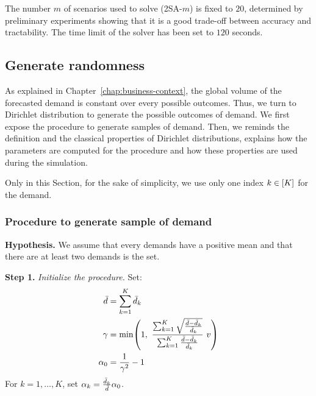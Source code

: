 The number $m$ of scenarios used to solve (2SA-$m$) is fixed to $20$, determined by preliminary experiments showing that it is a good trade-off between accuracy and tractability. The time limit of the solver has been set to $120$ seconds.



\subsection{Generate randomness}
\label{sec:PDP:numerical-experiments:dirichlet}


As explained in Chapter~\ref{chap:business-context}, the global volume of the forecasted demand is constant over every possible outcomes. Thus, we turn to Dirichlet distribution to generate the possible outcomes of demand. We first expose the procedure to generate samples of demand. Then, we reminds the definition and the classical properties of Dirichlet distributions, explains how the parameters are computed for the procedure and how these properties are used during the simulation.

Only in this Section, for the sake of simplicity, we use only one index $k\in\range{K}$ for the demand.



\subsubsection{Procedure to generate sample of demand}


\textbf{Hypothesis.} We assume that every demands have a positive mean and that there are at least two demands is the set.

\textbf{Step 1.} \emph{Initialize the procedure.}
Set:
\begin{subequations}
  \begin{align}
    \bar{\demand} &= \sum_{k=1}^K\bar{\demand}_k
    \\
    \gamma &= \min \bracket{1,\
    \frac
    {\sum_{k=1}^K\sqrt{\frac{\bar{\demand}-\bar{\demand}_k}{\bar{\demand}_k}}}{\sum_{k=1}^K\frac{\bar{\demand}-\bar{\demand}_k}{\bar{\demand}_k}}\ v}
    \\
    \alpha_0 &= \frac{1}{\gamma^2}-1
  \end{align}
\end{subequations}
For $k=1,\ldots,K$, set $\alpha_k=\frac{\bar{d}_k}{\bar{d}}\alpha_0$.

